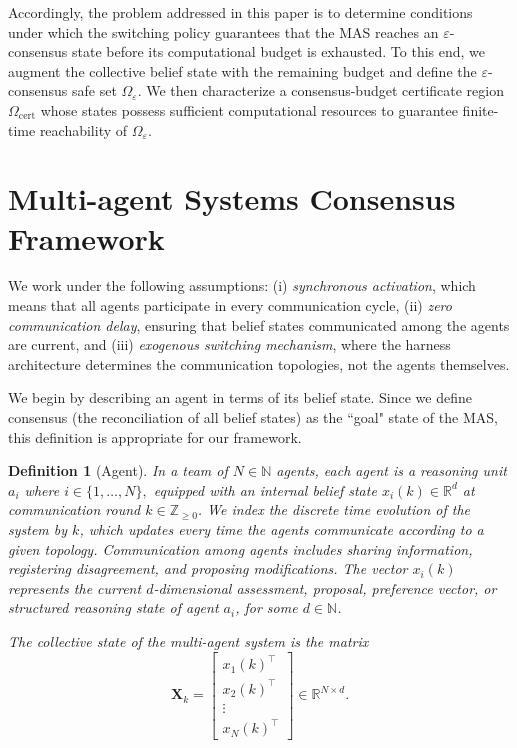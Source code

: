 \documentclass[journal,twoside,web]{ieeecolor_no_firstpage_logo}
\newtheorem{definition}{Definition}
\begin{document}
Accordingly, the problem addressed in this paper is to determine conditions under which the switching policy guarantees that the MAS reaches an $\varepsilon$-consensus state before its computational budget is exhausted. To this end, we augment the collective belief state with the remaining budget and define the $\varepsilon$-consensus safe set $\Omega_\varepsilon$. We then characterize a consensus-budget certificate region $\Omega_{\mathrm{cert}}$ whose states possess sufficient computational resources to guarantee finite-time reachability of $\Omega_\varepsilon$.



\section{Multi-agent Systems Consensus Framework}\label{sec:model}
We work under the following assumptions: (i) \textit{synchronous activation}, which means that all agents participate in every communication cycle, (ii) \textit{zero communication delay}, ensuring that belief states communicated among the agents are current, and (iii) \textit{exogenous switching mechanism}, where the harness architecture determines the communication topologies, not the agents themselves. 

We begin by describing an agent in terms of its belief state. Since we define consensus (the reconciliation of all belief states) as the ``goal" state of the MAS, this definition is appropriate for our framework.

\begin{definition}[Agent]\label{def:agent}
In a team of $N \in \mathbb{N}$ agents, each \emph{agent} is a reasoning unit
$
a_i$ where 
$i\in\{1,\ldots,N\},$
equipped with an internal belief state
$
x_i(k)\in\mathbb R^d
$
at communication round $k\in\mathbb Z_{\ge0}$. We index the discrete time evolution of the system by $k$, which updates every time the agents communicate according to a given topology. Communication among agents includes sharing information, registering disagreement, and proposing modifications.
The vector $x_i(k)$ represents the current $d$-dimensional assessment,
proposal, preference vector, or structured reasoning state of agent
$a_i$, for some $d \in \mathbb{N}$.

The collective state of the multi-agent system is the matrix
\[
\mathbf{X}_k
=
\begin{bmatrix}
x_1(k)^\top\\
x_2(k)^\top\\
\vdots\\
x_N(k)^\top
\end{bmatrix}
\in\mathbb R^{N\times d}.
\]
\end{definition}
\end{document}
